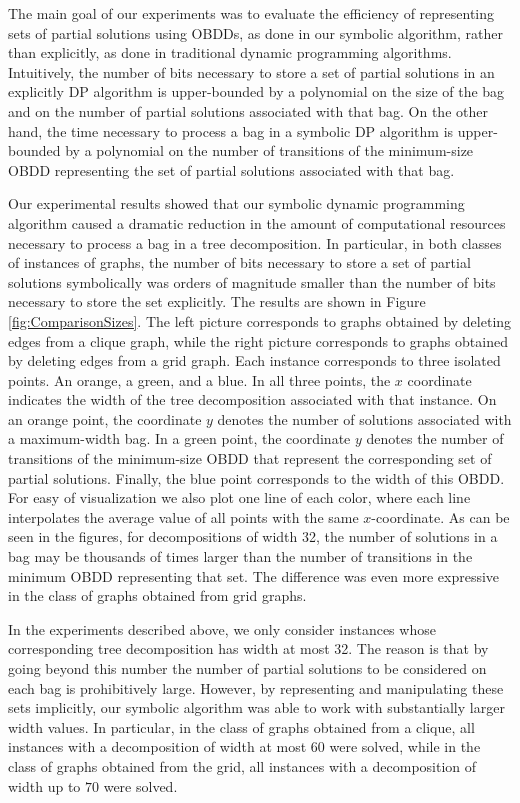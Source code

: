 The main goal of our experiments was to evaluate the efficiency of representing sets of partial solutions using OBDDs, as done in our symbolic algorithm, rather than explicitly, as done in traditional dynamic programming algorithms. Intuitively, the number of bits necessary to store a set of partial solutions in an explicitly DP algorithm is upper-bounded by a polynomial on the size of the bag and on the number of partial solutions associated with that bag. On the other hand, the time necessary to process a bag in a symbolic DP algorithm is upper-bounded by a polynomial on the number of transitions of the minimum-size OBDD representing the set of partial solutions associated with that bag.

Our experimental results showed that our symbolic dynamic programming algorithm caused a dramatic reduction in the amount of computational resources necessary to process a bag in a tree decomposition. In particular, in both classes of instances of graphs, the number of bits necessary to store a set of partial solutions symbolically was orders of magnitude smaller than the number of bits necessary to store the set explicitly. The results are shown in Figure \ref{fig:ComparisonSizes}. The left picture corresponds to graphs obtained by deleting edges from a clique graph, while the right picture corresponds to graphs obtained by deleting edges from a grid graph. Each instance corresponds to three isolated points. An orange, a green, and a blue. In all three points, the $x$ coordinate indicates the width of the tree decomposition associated with that instance. On an orange point, the coordinate $y$ denotes the number of solutions associated with a maximum-width bag. In a green point, the coordinate $y$ denotes the number of transitions of the minimum-size OBDD that represent the corresponding set of partial solutions. Finally, the blue point corresponds to the width of this OBDD. For easy of visualization we also plot one line of each color, where each line interpolates the average value of all points with the same $x$-coordinate. As can be seen in the figures, for decompositions of width 32, the number of solutions in a bag may be thousands of times larger than the number of transitions in the minimum OBDD representing that set. The difference was even more expressive in the class of graphs obtained from grid graphs. 

In the experiments described above, we only consider instances whose corresponding tree decomposition has width at most 32. The reason is that by going beyond this number the number of partial solutions to be considered on each bag is prohibitively large. However, by representing and manipulating these sets implicitly, our symbolic algorithm was able to work with substantially larger width values. In particular, in the class of graphs obtained from a clique, all instances with a decomposition of width at most 60 were solved, while in the class of graphs obtained from the grid, all instances with a decomposition of width up to $70$ were solved. 

